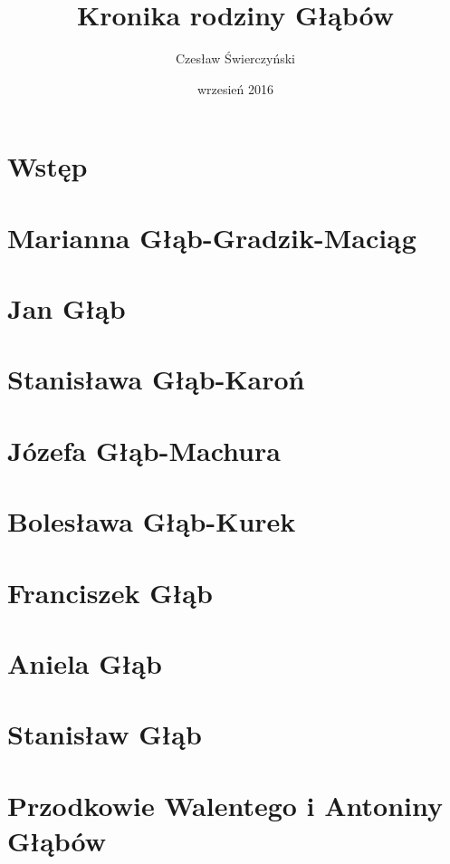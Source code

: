 \documentclass[12pt,a4paper,twoside]{extreport}
\title {Kronika rodziny Głąbów}
\author {Czesław Świerczyński}
\date {wrzesień 2016}
\begin{document}
\renewcommand{\figurename}{Ryc.}
\renewcommand{\listfigurename}{Spis rycin}

\doublespacing
\maketitle
\cleardoublepage
\setcounter{page}{1}

\onehalfspacing 


\chapter*{Wstęp}
\label{chap:wstep}


\chapter{Marianna Głąb-Gradzik-Maciąg}
\label{chap:marianna_glab}


\chapter{Jan Głąb}
\label{chap:jan_glab}


\chapter{Stanisława Głąb-Karoń}
\label{chap:stanislawa_glab}


\chapter{Józefa Głąb-Machura}
\label{chap:jozefa_glab}


\chapter{Bolesława Głąb-Kurek}
\label{chap:boleslawa_glab}


\chapter{Franciszek Głąb}
\label{chap:franciszek_glab}


\chapter{Aniela Głąb}
\label{chap:aniela_glab}


\chapter{Stanisław Głąb}
\label{chap:stanislaw_glab}


\chapter{Przodkowie Walentego i Antoniny Głąbów}
\label{chap:przodkowie}



\tableofcontents
\listoffigures
\end{document}
